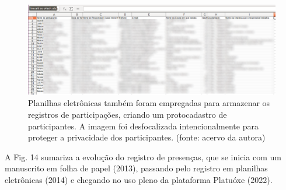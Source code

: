 \documentclass[
12pt,		%
openright,	%
twoside,  %
a4paper,			%
chapter=TITLE,		%
english,			%
french,				%
spanish,			%
brazil				%
]{USPSC-classe/USPSC}
\begin{document}
\begin{figure}[max size={\textwidth}{\textheight}]
\hspace{0.5cm}
\begin{minipage}[b]{0.4\linewidth}
        \centering
                \includegraphics[width=1.0\linewidth]{../../imagens/blurred-planilha2.png}
                \caption{Planilhas eletr\^onicas tamb\'em foram empregadas para armazenar os registros de participa\c{c}\~oes, criando um protocadastro de participantes. A imagem foi desfocalizada intencionalmente para proteger a privacidade dos participantes. (fonte: acervo da autora)}
                \label{b43907f0fa6b6fb935e7384ab03b508859ff0609}
\end{minipage}%
\hspace{0.5cm}
\end{figure}



A Fig. 14 sumariza a evolu\c{c}\~ao do registro de presen\c{c}as, que se inicia com um manuscrito em folha de papel (2013), passando pelo registro em planilhas eletr\^onicas (2014) e chegando no uso pleno da plataforma Platu\'oxe (2022).
\end{document}
